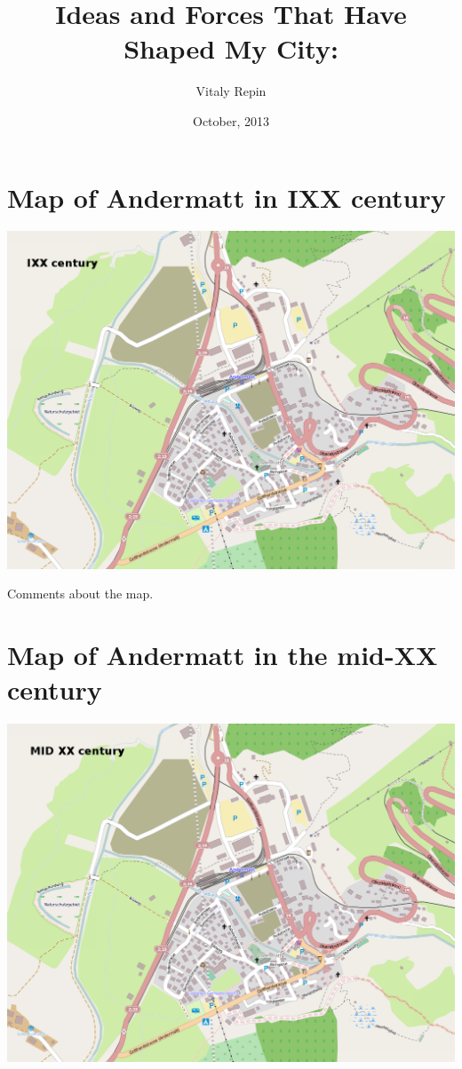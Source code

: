 \documentclass[a4paper]{article}
\author{Vitaly Repin}
\title{Ideas and Forces That Have Shaped My City: \emph{\mycity}}
\date{October, 2013}
\newcommand{\mycity}{Andermatt\xspace}
\begin{document}

\section{Map of \mycity in IXX century}
\includegraphics[keepaspectratio,width=\textwidth]{map1}

Comments about the map.

\newpage

\section{Map of \mycity in the mid-XX century}
\includegraphics[keepaspectratio,width=\textwidth]{map2}
\end{document}
